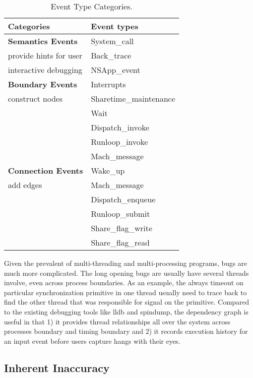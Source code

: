 \begin{table}[h]
  \centering
  \begin{tabularx}{\columnwidth}{|X|X|}
  	\hline
    \textbf{Categories} & \textbf{Event types}\\
	\hline
	\hline
    {\bf Semantics Events} & System\_call\\
    provide hints for user & Back\_trace\\					   
	interactive debugging  & NSApp\_event\\
    \hline
    {\bf Boundary Events} & Interrupts\\
	construct nodes & Sharetime\_maintenance\\
	& Wait\\
	& Dispatch\_invoke\\
    & Runloop\_invoke\\
	& Mach\_message\\
    \hline
	{\bf Connection Events} & Wake\_up\\
    add edges & Mach\_message\\
    & Dispatch\_enqueue\\
    & Runloop\_submit\\
	& Share\_flag\_write\\
	& Share\_flag\_read\\
    \hline
  \end{tabularx}
  \caption{Event Type Categories. }
  \label{table:event_types}
\end{table}

Given the prevalent of multi-threading and multi-processing programs, bugs are
much more complicated. The long opening bugs are usually have several threads
involve, even across process boundaries. As an example, the always timeout on
particular synchronization primitive in one thread usually need to trace back to
find the other thread that was responsible for signal on the primitive. Compared
to the existing debugging tools like lldb and spindump, the dependency graph is
useful in that 1) it provides thread relationships all over the system across
processes boundary and timing boundary and 2) it records execution history for
an input event before users capture hangs with their eyes.

\subsection{Inherent Inaccuracy}\label{subsec:inherentinaccuracy}

